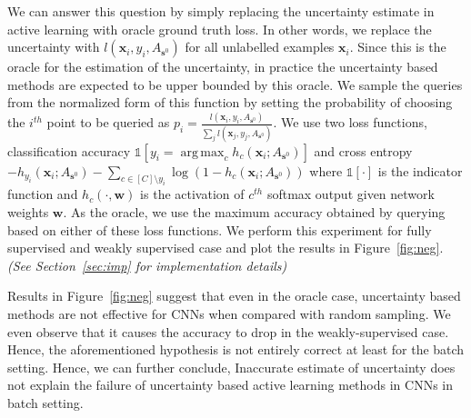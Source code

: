 \documentclass{article}
\DeclareMathOperator*{\argmax}{arg\,max}
\begin{document}
We can answer this question by simply replacing the uncertainty estimate in active learning with oracle ground truth loss. In other words, we replace the uncertainty with $l(\mathbf{x}_i,y_i,A_{\mathbf{s}^0})$ for all unlabelled examples $\mathbf{x}_i$. Since this is the oracle for the estimation of the uncertainty, in practice the uncertainty based methods are expected to be upper bounded by this oracle. We sample the queries from the normalized form of this function by setting the probability of choosing the $i^{th}$ point to be queried as $p_i=\frac{l(\mathbf{x}_i,y_i,A_{\mathbf{s}^0})}{\sum_j l(\mathbf{x}_j,y_j,A_{\mathbf{s}^0})}$. We use two loss functions, classification accuracy \mbox{$\mathds{1}[y_i = \argmax_c h_c(\mathbf{x}_i;A_{\mathbf{s}^0})]$} and cross entropy \mbox{$ - h_{y_i}(\mathbf{x}_i;A_{\mathbf{s}^0}) -\sum_{c \in [C] \setminus y_i} \log(1-  h_{c}(\mathbf{x}_i;A_{\mathbf{s}^0}))$} where $\mathds{1}[\cdot]$ is the indicator function and $h_c(\cdot,\mathbf{w})$ is the activation of $c^{th}$ softmax output given network weights $\mathbf{w}$. As the oracle, we use the maximum accuracy obtained by querying based on either of these loss functions. We perform this experiment for fully supervised and weakly supervised case and plot the results in Figure~\ref{fig:neg}. \emph{(See Section~\ref{sec:imp} for implementation details)}

Results in Figure~\ref{fig:neg} suggest that even in the oracle case, uncertainty based methods are not effective for CNNs when compared with random sampling. We even observe that it causes the accuracy to drop in the weakly-supervised case. Hence, the aforementioned hypothesis is not entirely correct at least for the batch setting. Hence, we can further conclude, Inaccurate estimate of uncertainty does not explain the failure of uncertainty based active learning methods in CNNs in batch setting. 
\end{document}
